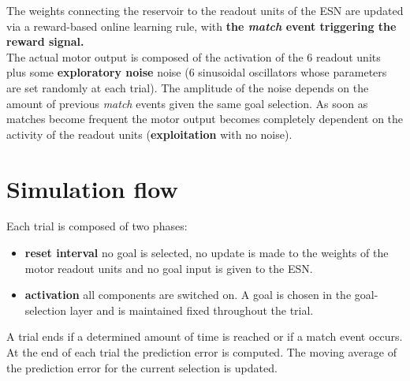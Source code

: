 \documentclass[11pt]{article}
\begin{document}
The weights connecting the reservoir to the readout units of the ESN are
updated via a reward-based online learning rule, with \textbf{the \emph{match}
event triggering the reward signal.} \\

The actual motor output is composed of the activation of the 6 readout units
plus some \textbf{exploratory noise} noise (6 sinusoidal oscillators whose parameters are set randomly at each
trial). The amplitude of the noise depends on the amount of previous \emph{match} events given the
same goal selection.  As soon as matches become frequent the motor output becomes
completely dependent on the activity of the readout units
(\textbf{exploitation} with no noise). 


\section{Simulation flow}
\label{sec:simflow}

Each trial is composed of two phases:

\begin{itemize}

    \item \textbf{reset interval} no goal is selected, no update is made to the
        weights of the motor readout units and no goal input is given to the
        ESN. 

    \item \textbf{activation} all components are switched on. A goal is chosen
        in the goal-selection layer and is maintained fixed throughout the
        trial.

\end{itemize}

A trial ends if a determined amount of time is reached or if a match event
occurs.  At the end of each trial the prediction error is computed. The moving
average of the prediction error for the current selection is updated.
\end{document}
